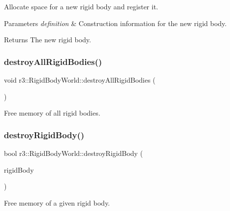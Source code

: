 Allocate space for a new rigid body and register it. 


\begin{DoxyParams}{Parameters}
{\em definition} & Construction information for the new rigid body. \\
\hline
\end{DoxyParams}
\begin{DoxyReturn}{Returns}
The new rigid body. 
\end{DoxyReturn}
\mbox{\label{classr3_1_1_rigid_body_world_acdfd6a392a98366cd8414f7f6f50917f}} 
\subsubsection{\texorpdfstring{destroy\+All\+Rigid\+Bodies()}{destroyAllRigidBodies()}}
{\footnotesize\ttfamily void r3\+::\+Rigid\+Body\+World\+::destroy\+All\+Rigid\+Bodies (\begin{DoxyParamCaption}{ }\end{DoxyParamCaption})}



Free memory of all rigid bodies. 

\mbox{\label{classr3_1_1_rigid_body_world_a1a203fb9675eba999e0f59c23e597111}} 
\subsubsection{\texorpdfstring{destroy\+Rigid\+Body()}{destroyRigidBody()}}
{\footnotesize\ttfamily bool r3\+::\+Rigid\+Body\+World\+::destroy\+Rigid\+Body (\begin{DoxyParamCaption}\item[{\mbox{\hyperlink{classr3_1_1_rigid_body}{Rigid\+Body}} $\ast$}]{rigid\+Body }\end{DoxyParamCaption})}



Free memory of a given rigid body. 


